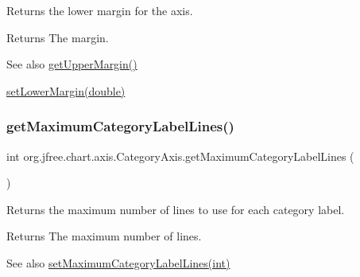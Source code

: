Returns the lower margin for the axis.

\begin{DoxyReturn}{Returns}
The margin.
\end{DoxyReturn}
\begin{DoxySeeAlso}{See also}
\mbox{\hyperlink{classorg_1_1jfree_1_1chart_1_1axis_1_1_category_axis_a3495765b4523a50ae7e352292bdb3ae4}{get\+Upper\+Margin()}} 

\mbox{\hyperlink{classorg_1_1jfree_1_1chart_1_1axis_1_1_category_axis_a88698d2061063cb5172c363be686b115}{set\+Lower\+Margin(double)}} 
\end{DoxySeeAlso}
\mbox{\label{classorg_1_1jfree_1_1chart_1_1axis_1_1_category_axis_a9f982c4d5747dad3f3c1580ffaa90104}} 
\subsubsection{\texorpdfstring{get\+Maximum\+Category\+Label\+Lines()}{getMaximumCategoryLabelLines()}}
{\footnotesize\ttfamily int org.\+jfree.\+chart.\+axis.\+Category\+Axis.\+get\+Maximum\+Category\+Label\+Lines (\begin{DoxyParamCaption}{ }\end{DoxyParamCaption})}

Returns the maximum number of lines to use for each category label.

\begin{DoxyReturn}{Returns}
The maximum number of lines.
\end{DoxyReturn}
\begin{DoxySeeAlso}{See also}
\mbox{\hyperlink{classorg_1_1jfree_1_1chart_1_1axis_1_1_category_axis_a04818cb638781c835730b6d0fc64f468}{set\+Maximum\+Category\+Label\+Lines(int)}} 
\end{DoxySeeAlso}
\mbox{\label{classorg_1_1jfree_1_1chart_1_1axis_1_1_category_axis_a0c0286d9bf8c1fc7250d44b67969ab6a}} 

